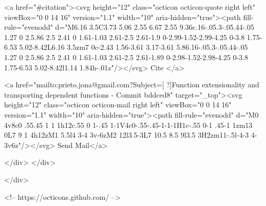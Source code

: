       <a  href="#citation"><svg height="12" class="octicon octicon-quote right left" viewBox="0 0 14 16" version="1.1" width="10" aria-hidden="true"><path fill-rule="evenodd" d="M6.16 3.5C3.73 5.06 2.55 6.67 2.55 9.36c.16-.05.3-.05.44-.05 1.27 0 2.5.86 2.5 2.41 0 1.61-1.03 2.61-2.5 2.61-1.9 0-2.99-1.52-2.99-4.25 0-3.8 1.75-6.53 5.02-8.42L6.16 3.5zm7 0c-2.43 1.56-3.61 3.17-3.61 5.86.16-.05.3-.05.44-.05 1.27 0 2.5.86 2.5 2.41 0 1.61-1.03 2.61-2.5 2.61-1.89 0-2.98-1.52-2.98-4.25 0-3.8 1.75-6.53 5.02-8.42l1.14 1.84h-.01z"/></svg> Cite
      </a>

      <a href="mailto:prieto.jona@gmail.com?Subject=[ ?]Function extensionality and transporting dependent functions  - Commit bddced8" target="_top"><svg height="12" class="octicon octicon-mail right left" viewBox="0 0 14 16" version="1.1" width="10" aria-hidden="true"><path fill-rule="evenodd" d="M0 4v8c0 .55.45 1 1 1h12c.55 0 1-.45 1-1V4c0-.55-.45-1-1-1H1c-.55 0-1 .45-1 1zm13 0L7 9 1 4h12zM1 5.5l4 3-4 3v-6zM2 12l3.5-3L7 10.5 8.5 9l3.5 3H2zm11-.5l-4-3 4-3v6z"/></svg> Send Mail</a>

    </div>
  </div>

</div>

<!-- https://octicons.github.com/ -->





